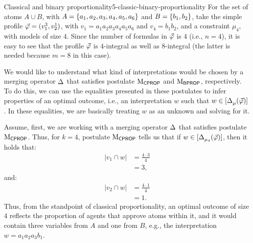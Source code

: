 \begin{xmpl}{Classical and binary proportionality}{5-classic-binary-proportionality}
	For the set of atoms $A\cup B$, with $A=\set{a_1,a_2,a_3,a_4,a_5,a_6}$ and $B=\set{b_1,b_2}$,
	take the simple profile $\P=(v_1^3,v_2^1)$, with $v_1=a_1a_2a_3a_4a_5a_6$ and $v_4=b_1b_2$,
	and a constraint $\mu_4$, with models of size $4$.
	Since the number of formulas in $\P$ is $4$ (i.e., $n=4$),
	it is easy to see that the profile $\P$ is $4$-integral as well as $8$-integral
	(the latter is needed because $m=8$ in this case).
	
	We would like to understand what kind of interpretations would be chosen by a merging operator $\mer{}{}$
	that satisfies postulate $\ppm{\CPROP}$ and $\ppm{\BPROP}$, respectively.
	To do this, we can use the equalities presented in these postulates to infer properties
	of an optimal outcome, i.e., an interpretation $w$ such that $w\in\mods{\mer{}{\mu}(\P)}$.
	In these equalities, we are basically treating $w$ as an unknown and solving for it.

	Assume, first, we are working with a merging operator $\mer{}{}$ that satisfies postulate $\ppm{\CPROP}$.
	Thus, for $k=4$, postulate $\ppm{\CPROP}$ tells us that if $w\in\mods{\mer{}{\mu_4}(\P)}$,
	then it holds that:
	\begin{align*}
		|v_1\cap w|&=\frac{4\cdot 3}{4}\\
					&=3,
	\end{align*}
	and:
	\begin{align*}
	|v_2\cap w|&=\frac{4\cdot 1}{4}\\
	&=1.
	\end{align*}	
	Thus, from the standpoint of classical  proportionality,
	an optimal outcome of size $4$ reflects the proportion of agents that approve atoms within it,
	and it would contain three variables from $A$
	and one from $B$, e.g., the interpretation $w=a_1a_2a_3b_1$.
		

\end{xmpl}
